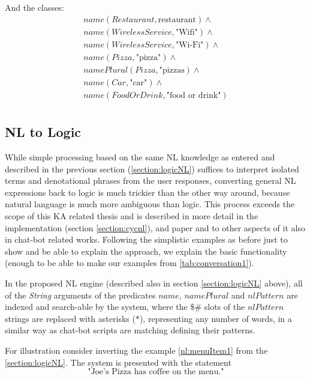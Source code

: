 And the classes:
\begin{equation}\label{as:nl:classes}
\begin{gathered}
    name(Restaurant, \text{restaurant}) \land \\
    name(WirelessService, \text{"Wifi"}) \land \\
    name(WirelessService, \text{"Wi-Fi"}) \land \\
	name(Pizza, \text{"pizza"}) \land \\
	namePlural(Pizza, \text{"pizzas}) \land \\
	name(Car, \text{"car"}) \land \\
	name(FoodOrDrink, \text{"food or drink"}) \\
\end{gathered}
\end{equation}

\subsection{NL to Logic}
\label{section:NLLogic}
While simple processing based on the same NL knowledge as entered and described
in the previous section (\autoref{section:logicNL}) suffices to interpret 
isolated terms and denotational phrases from the user responses, converting 
general NL expressions back to logic is much trickier than the other way 
around, because natural language is much more ambiguous than logic. This 
process exceeds the scope of this KA related thesis and is 
described in more detail in the implementation (section \ref{section:cycnl}), 
and paper 
\parencite{Schneider2015} and to other aspects of it also in chat-bot related
works\parencite{Wallace2013,Wilcox2011}. Following the simplistic examples as
before just to show and be able to explain the approach, we explain the basic 
functionality (enough to be able to make our examples from 
\autoref{tab:conversation1}).

In the proposed NL engine (described also in section \ref{section:logicNL}
above), all of the \emph{String} arguments of the predicates $name$, 
$namePlural$ and $nlPattern$ are indexed and search-able by the system, where
the $\$\#$ slots of the $nlPattern$ strings are replaced with asterisks ($*$),
representing any number of words, in a similar way as chat-bot scripts are
matching defining their patterns\parencite{Wilcox2011}.

For illustration consider inverting the example \ref{nl:menuItem1} from the
\autoref{section:logicNL}. The system is presented with the statement
\begin{equation}\label{nl:joespizzamenu}
\text{"Joe's Pizza has coffee on the menu."}
\end{equation}


